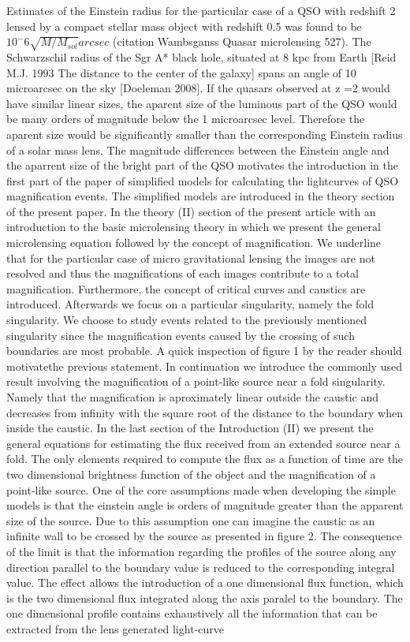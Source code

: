 Estimates of the Einstein radius for the particular case of a QSO with redshift 2 lensed by a compact stellar mass object with redshift 0.5 was found to be $10^-6 \sqrt{M/M_{sol}} arcsec$ (citation Wambsganss Quasar microlensing 527). The Schwarzschil radius of the Sgr A* black hole, situated at 8 kpc from Earth [Reid M.J. 1993 The distance to the center of the galaxy] spans an angle of 10 microarcsec on the sky [Doeleman 2008]. If the quasars observed at z =2 would have similar linear sizes, the aparent size of the  luminous part of the QSO would be many orders of magnitude below the 1 microarcsec level. Therefore the aparent size would be significantly smaller than the corresponding Einstein radius of a solar mass lens. 
The magnitude differences between the Einstein angle and the aparrent size of the bright part of the QSO motivates the introduction in the first part of the paper of simplified models for     
calculating the lightcurves of QSO magnification events. The simplified models are introduced in the theory section of the present paper. In the theory (II) section of the present article with an introduction to the basic microlensing theory in which we present the general microlensing equation followed by the concept of magnification. We underline that for the particular case of micro gravitational lensing
the images are not resolved and thus the magnifications of each images contribute to a total magnification. Furthermore, the concept of critical curves and caustics are introduced. Afterwards we focus on a particular singularity, namely the fold singularity. We choose to study events related to the previously mentioned singularity since the magnification events caused by the crossing of such boundaries are most probable. A quick inspection of figure 1 by the reader should motivatethe previous statement. 
In continuation we introduce the commonly used result involving the magnification of a point-like source near a fold singularity. Namely that the magnification is aproximately linear outside the caustic and decreases from infinity with the square root of the distance to the boundary when inside the caustic.  
In the last section of the Introduction (II) we present the general equations for estimating the flux received from an extended source near a fold. The only elements required to compute the flux as a function of time are the two dimensional brightness function of the object and the magnification of a point-like source. One of the core
assumptions made when developing the simple models is that the einstein angle is orders of magnitude greater than the apparent size of the source. Due to this assumption one can imagine the caustic as an infinite wall to be crossed by the source as presented in figure 2. The consequence of the limit is that the information regarding the profiles of the source along any direction parallel to the boundary value is reduced to the corresponding integral value. The effect allows the introduction of a one dimensional flux function, which is the two dimensional flux integrated along the axis paralel to the boundary. The one dimensional profile contains exhaustively all the information that can be extracted  from the lens generated light-curve \\

